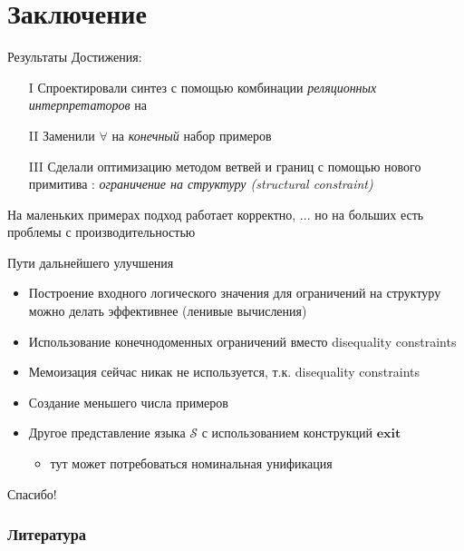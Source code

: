 \documentclass[aspectratio=169
  , xcolor={svgnames}
  , hyperref={ colorlinks,citecolor=Blue
             , linkcolor=DarkRed,urlcolor=DarkBlue}
  , russian
  ]{beamer}
\newcommand{\primi}[1]{\ensuremath{\mathbf{#1}}}
\newcommand{\ir}{\ensuremath{\mathcal{S}}}
\newcommand{\contributions}{
\begin{enumerate}
\item[I] Спроектировали синтез с помощью комбинации \emph{реляционных интерпретаторов} на \miniKanren{}
\item[II] Заменили $\forall$ на \emph{конечный} набор примеров
\item[III] Сделали оптимизацию методом ветвей и границ с помощью нового примитива \miniKanren{}: \emph{ограничение на структуру (structural constraint)}
\end{enumerate}
}
\begin{document}
\section{Заключение}

\begin{frame}{Результаты}%
Достижения: \contributions
\vspace{1em}

На маленьких примерах подход работает корректно, ... но на больших есть проблемы с производительностью 
\vspace{1em}
\end{frame}


\begin{frame}{Пути дальнейшего улучшения}
\begin{itemize}
\item Построение входного логического значения для  ограничений на структуру можно делать эффективнее (ленивые вычисления)
\item Использование конечнодоменных ограничений вместо disequality constraints 
\item Мемоизация сейчас никак не используется, т.к.  disequality constraints
\item Создание меньшего числа примеров
\item Другое представление языка \ir{} с использованием конструкций \primi{exit}
\begin{itemize}
\item тут может потребоваться номинальная унификация
\end{itemize}
\end{itemize}
\end{frame}

\begin{frame}
\begin{center}
{\Huge Спасибо!}
\end{center}
\end{frame}


\begin{frame}%
\frametitle{Литература}


\vspace{1cm}
\end{frame}
\end{document}
